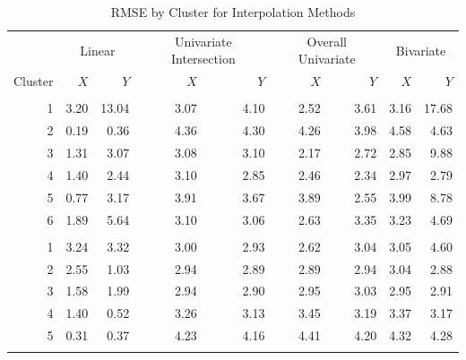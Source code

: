 \documentclass[12pt]{article}
\begin{document}
\begin{table}

\caption{\label{tab:results-clust-actual}RMSE by Cluster for Interpolation Methods}
\centering
\begin{tabular}[t]{rrrrrrrrr}
\toprule
\multicolumn{1}{c}{ } & \multicolumn{2}{c}{Linear} & \multicolumn{2}{c}{Univariate Intersection} & \multicolumn{2}{c}{Overall Univariate} & \multicolumn{2}{c}{Bivariate} \\
\cmidrule(l{3pt}r{3pt}){2-3} \cmidrule(l{3pt}r{3pt}){4-5} \cmidrule(l{3pt}r{3pt}){6-7} \cmidrule(l{3pt}r{3pt}){8-9}
Cluster & $X$ & $Y$ & $X$ & $Y$ & $X$ & $Y$ & $X$ & $Y$\\
\midrule
\addlinespace[0.3em]
\multicolumn{9}{l}{\textbf{Cluster 1}}\\
\hspace{1em}1 & 3.20 & 13.04 & 3.07 & 4.10 & 2.52 & 3.61 & 3.16 & 17.68\\
\hspace{1em}2 & 0.19 & 0.36 & 4.36 & 4.30 & 4.26 & 3.98 & 4.58 & 4.63\\
\hspace{1em}3 & 1.31 & 3.07 & 3.08 & 3.10 & 2.17 & 2.72 & 2.85 & 9.88\\
\hspace{1em}4 & 1.40 & 2.44 & 3.10 & 2.85 & 2.46 & 2.34 & 2.97 & 2.79\\
\hspace{1em}5 & 0.77 & 3.17 & 3.91 & 3.67 & 3.89 & 2.55 & 3.99 & 8.78\\
\hspace{1em}6 & 1.89 & 5.64 & 3.10 & 3.06 & 2.63 & 3.35 & 3.23 & 4.69\\
\addlinespace[0.3em]
\multicolumn{9}{l}{\textbf{Cluster 2}}\\
\hspace{1em}1 & 3.24 & 3.32 & 3.00 & 2.93 & 2.62 & 3.04 & 3.05 & 4.60\\
\hspace{1em}2 & 2.55 & 1.03 & 2.94 & 2.89 & 2.89 & 2.94 & 3.04 & 2.88\\
\hspace{1em}3 & 1.58 & 1.99 & 2.94 & 2.90 & 2.95 & 3.03 & 2.95 & 2.91\\
\hspace{1em}4 & 1.40 & 0.52 & 3.26 & 3.13 & 3.45 & 3.19 & 3.37 & 3.17\\
\hspace{1em}5 & 0.31 & 0.37 & 4.23 & 4.16 & 4.41 & 4.20 & 4.32 & 4.28\\
\addlinespace[0.3em]

\end{tabular}
\end{table}
\end{document}
